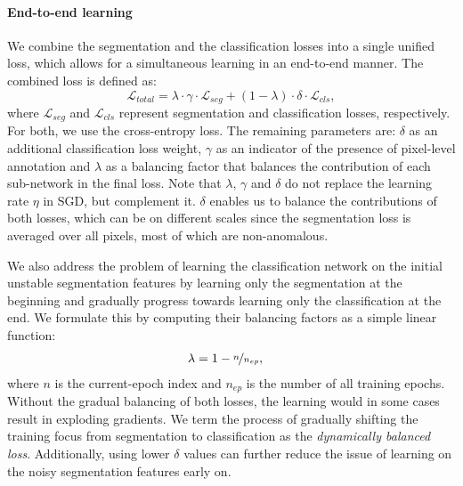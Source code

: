 \paragraph{End-to-end learning}
We combine the segmentation and the classification losses into a single unified loss, which allows for a simultaneous learning in an end-to-end manner. The combined loss is defined as:
\begin{equation} \label{eq:loss_total}
    \mathcal{L}_{total} = \lambda \cdot \gamma \cdot \mathcal{L}_{seg} + (1-\lambda) \cdot \delta \cdot  \mathcal{L}_{cls},
\end{equation}
where $\mathcal{L}_{seg}$ and $\mathcal{L}_{cls}$ represent segmentation and classification losses, respectively. For both, we use the cross-entropy loss. The remaining parameters are: $\delta$ as an additional classification loss weight, $\gamma$ as an indicator of the presence of pixel-level annotation and $\lambda$ as a balancing factor that balances the contribution of each sub-network in the final loss. Note that $\lambda$, $\gamma$ and $\delta$ do not replace the learning rate $\eta$ in SGD, but complement it.
$\delta$ enables us to balance the contributions of both losses, which can be on different scales since the segmentation loss is averaged over all pixels, most of which are non-anomalous.

We also address the problem of learning the classification network on the initial unstable segmentation features by learning only the segmentation at the beginning and gradually progress towards learning only the classification at the end. We formulate this by computing their balancing factors as a simple linear function:
\begin{align}
    \lambda &= 1 - \nicefrac{n}{n_{ep}},
\end{align}
where $n$ is the current-epoch index and $n_{ep}$ is the number of all training epochs. Without the gradual balancing of both losses, the learning would in some cases result in exploding gradients. We term the process of gradually shifting the training focus from segmentation to classification as the \textit{dynamically balanced loss}. 
Additionally, using lower $\delta$ values can further reduce the issue of learning on the noisy segmentation features early on.

